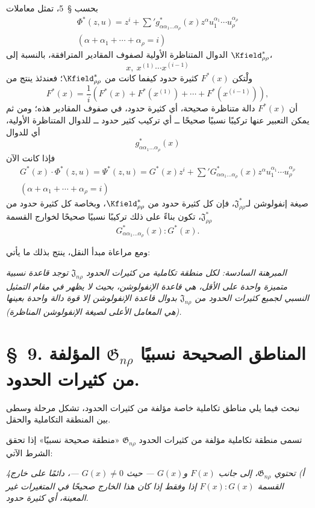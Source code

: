 \documentclass[11pt]{article}
\providecommand{\Jdom}{\mathfrak{J}}
\providecommand{\Gdom}{\mathfrak{G}}
\begin{document}
بحسب \S\ 5، تمثل معاملات
\[
\begin{gathered}
\Phi^*(z,u)=z^i+\sum{}'g^*_{\alpha\alpha_1\ldots\alpha_\rho}(x)z^\alpha u_1^{\alpha_1}\cdots u_\rho^{\alpha_\rho}\\
(\alpha+\alpha_1+\cdots+\alpha_\rho=i)
\end{gathered}
\]
الدوال المتناظرة الأولية لصفوف المقادير المترافقة، بالنسبة إلى $\Kfield^*_{\rho\rho}$،
\[
x,\ x^{(1)}\cdots x^{(i-1)}
\]
ولْتكن $F^*(x)$ كثيرة حدود كيفما كانت من $\Kfield^*_{\rho\rho}$؛ فعندئذ ينتج من
\[
F^*(x)=\frac1i\left(F^*(x)+F^*(x^{(1)})+\cdots+F^*(x^{(i-1)})\right),
\]
أن $F^*(x)$ دالة متناظرة صحيحة، أي كثيرة حدود، في صفوف المقادير هذه؛ ومن ثم يمكن التعبير عنها تركيبًا نسبيًا صحيحًا ــ أي تركيب كثير حدود ــ للدوال المتناظرة الأولية، أي للدوال
\[
g^*_{\alpha\alpha_1\ldots\alpha_\rho}(x)
\]
فإذا كانت الآن
\[
\begin{gathered}
G^*(x)\cdot\Phi^*(z,u)=\Psi^*(z,u)=G^*(x)z^i+
\sum{}'G^*_{\alpha\alpha_1\ldots\alpha_\rho}(x)z^\alpha u_1^{\alpha_1}\cdots u_\rho^{\alpha_\rho}\\
(\alpha+\alpha_1+\cdots+\alpha_\rho=i)
\end{gathered}
\]
صيغة إنفولوشن لـ$\Jdom^*_{\rho\rho}$، فإن كل كثيرة حدود من $\Kfield^*_{\rho\rho}$، وبخاصة كل كثيرة حدود من $\Jdom^*_{\rho\rho}$، تكون بناءً على ذلك تركيبًا نسبيًا صحيحًا لخوارج القسمة
\[
G^*_{\alpha\alpha_1\ldots\alpha_\rho}(x):G^*(x).
\]

ومع مراعاة مبدأ النقل، ينتج بذلك ما يأتي:

\emph{المبرهنة السادسة: لكل منطقة تكاملية من كثيرات الحدود $\Jdom_{n\rho}$ توجد قاعدة نسبية متميزة واحدة على الأقل، هي قاعدة الإنفولوشن، بحيث لا يظهر في مقام التمثيل النسبي لجميع كثيرات الحدود من $\Jdom_{n\rho}$ بدوال قاعدة الإنفولوشن إلا قوة دالة واحدة بعينها (هي المعامل الأعلى لصيغة الإنفولوشن المناظرة).}

\section*{\S\ 9. المناطق الصحيحة نسبيًا $\Gdom_{n\rho}$ المؤلفة من كثيرات الحدود.}

نبحث فيما يلي مناطق تكاملية خاصة مؤلفة من كثيرات الحدود، تشكل مرحلة وسطى بين المنطقة التكاملية والحقل.

تسمى منطقة تكاملية مؤلفة من كثيرات الحدود $\Gdom_{n\rho}$ «منطقة صحيحة نسبيًا» إذا تحقق الشرط الآتي:

\emph{4أ) تحتوي $\Gdom_{n\rho}$، إلى جانب $F(x)$ و$G(x)$ --- حيث $G(x)\ne0$ ---، دائمًا على خارج القسمة $F(x):G(x)$ إذا وفقط إذا كان هذا الخارج صحيحًا في المتغيرات غير المعينة، أي كثيرة حدود.}
\end{document}
